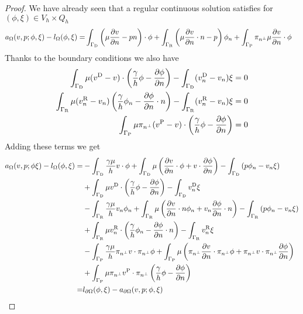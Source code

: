 \begin{proof}
We have already seen that a regular continuous solution satisfies for $(\phi,\xi)\in V_h\times Q_h$
%
%
\begin{align*}
a_{\Omega}(v,p; \phi,\xi)  - l_{\Omega}(\phi,\xi) =& 
\int_{\Gamma_{\rm D}} \left( \mu\frac{\partial v}{\partial n} - pn\right)\cdot\phi
+ \int_{\Gamma_{\rm R}} \left( \mu\frac{\partial v}{\partial n}\cdot n-p\right)\phi_n
+ \int_{\Gamma_{\rm P}} \pi_{n^{\perp}}\mu\frac{\partial v}{\partial n} \cdot\phi
\end{align*}
%
Thanks to the boundary conditions we also have
%
\begin{align*}
\int_{\Gamma_{\rm D}}\mu(v^{\rm D}-v)\cdot\left( \frac{\gamma}{h}\phi - \frac{\partial \phi}{\partial n}\right)- \int_{\Gamma_{\rm D}}(v^{\rm D}_n-v_n)\xi =0\\
\int_{\Gamma_{\rm R}} \mu(v^{\rm R}_n-v_n)\left( \frac{\gamma}{h}\phi_n - \frac{\partial \phi}{\partial n}\cdot n\right) - \int_{\Gamma_{\rm R}}(v^{\rm R}_n-v_n)\xi = 0\\
\int_{\Gamma_{\rm P}}\mu\pi_{n^{\perp}}(v^{\rm P}-v)\cdot\left( \frac{\gamma}{h}\phi - \frac{\partial \phi}{\partial n}\right) =0
\end{align*}
%
Adding these terms we get
%
\begin{align*}
a_{\Omega}(v,p; \phi\xi)  - l_{\Omega}(\phi,\xi) =&
-\int_{\GammaD}\frac{\gamma\mu}{h}v\cdot\phi
+ \int_{\GammaD} \mu\left( \dn{v}\cdot\phi + v\cdot\dn{\phi} \right)
- \int_{\GammaD} \left( p\phi_n - v_n\xi\right)\\
&+ \int_{\GammaD}\mu\vD\cdot\left( \frac{\gamma}{h}\phi - \dn{\phi}\right)- \int_{\GammaD}\vD_n\xi\\
&-\int_{\GammaR}\frac{\gamma\mu}{h}v_n\phi_n
+ \int_{\GammaR} \mu\left( \dn{v}\cdot n \phi_n + v_n\dn{\phi}\cdot n \right)
- \int_{\GammaR} \left( p\phi_n - v_n\xi\right)\\
&+ \int_{\GammaR}\mu\vRn\cdot\left( \frac{\gamma}{h}\phi_n - \dn{\phi}\cdot n\right)- \int_{\GammaR}\vRn\xi\\
&-\int_{\GammaP}\frac{\gamma\mu}{h}\pitang v\cdot\pitang\phi
+ \int_{\GammaP} \mu\left( \pitang\dn{v}\cdot\pitang\phi + \pitang v\cdot\pitang\dn{\phi} \right)\\
&+ \int_{\GammaP}\mu\pitang\vP\cdot\pitang\left( \frac{\gamma}{h}\phi - \dn{\phi}\right)\\
%
=& l_{\partial\Omega}(\phi,\xi) - a_{\partial\Omega}(v,p; \phi,\xi)
\end{align*}
%

%
\end{proof}
%



